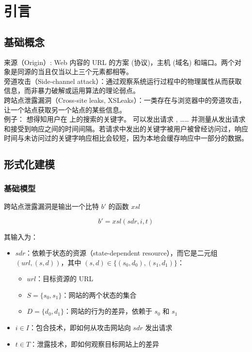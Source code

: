 \section{引言}

\subsection{基础概念}

来源（Origin）\cite{origin}: Web 内容的 URL 的方案 (协议)，主机 (域名) 和端口。两个对象是同源的当且仅当以上三个元素都相等。\\

旁道攻击（Side-channel attack）：通过观察系统运行过程中的物理属性从而获取信息，而非暴力破解或运用算法的理论弱点。\\

跨站点泄露漏洞（Cross-site leaks, XSLeaks）\cite{xsleaks}：一类存在与浏览器中的旁道攻击，让一个站点获取另一个站点的某些信息。\\


例子： 想得知用户在  上的搜索的关键字。 可以发出请求 ,  …… 并测量从发出请求和接受到响应之间的时间间隔。若请求中发出的关键字被用户被曾经访问过，响应时间与未访问过的关键字响应相比会较短，因为本地会缓存响应中一部分的数据。\\

\subsection{形式化建模}

\subsubsection{基础模型\cite{modelbase}}

跨站点泄露漏洞是输出一个比特 $b'$ 的函数 $xsl$

$$b'=xsl(sdr, i, t)$$

其输入为：

\begin{itemize}
    \item $sdr$：依赖于状态的资源（state-dependent resource），而它是二元组 $(url, (s, d))$，其中 $(s, d)\in\{(s_0, d_0), (s_1, d_1)\}$：
    \begin{itemize}
        \item $url$：目标资源的 URL
        \item $S=\{s_0, s_1\}$：网站的两个状态的集合
        \item $D=\{d_0, d_1\}$：网站的行为的差异，依赖于 $s_0$ 和 $s_1$
    \end{itemize}
    \item $i\in I$：包合技术，即如何从攻击网站向 $sdr$ 发出请求
    \item $t\in T$：泄露技术，即如何观察目标网站上的差异
\end{itemize}


